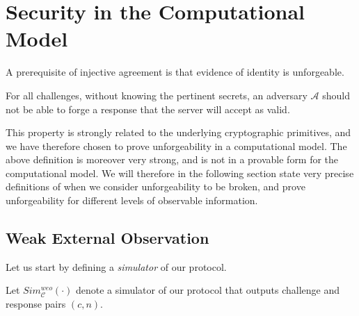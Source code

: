 \begin{comment}
\begin{itemize}

    \item An adversary should not be able to forge evidence of identity without compromising the secrets of both \gls{authenticator} and \gls{sibling}.
    
    \item Hijacking an active session or token should not give the \gls{adversary} unauthorized access for longer than the session is actively kept alive by the \gls{server} and \gls{authenticator}.
    
\end{itemize}
\end{comment}

\section{Security in the Computational Model}

A prerequisite of injective agreement is that evidence of identity is unforgeable.

\begin{definition}[Unforgeability]
For all challenges, without knowing the pertinent secrets, an adversary $\mathcal{A}$ should not be able to forge a response that the \gls{server} will accept as valid.
\end{definition}

This property is strongly related to the underlying cryptographic primitives, and we have therefore chosen to prove unforgeability in a computational model. The above definition is moreover very strong, and is not in a provable form for the computational model. We will therefore in the following section state very precise definitions of when we consider unforgeability to be broken, and prove unforgeability for different levels of observable information.

\subsection{Weak External Observation}
Let us start by defining a \textit{simulator} of our protocol.
\begin{definition} 
Let $Sim^{weo}_\mathcal{C}(\cdot)$ denote a simulator of our protocol that outputs challenge and response pairs $(c, n)$. 
\end{definition}

